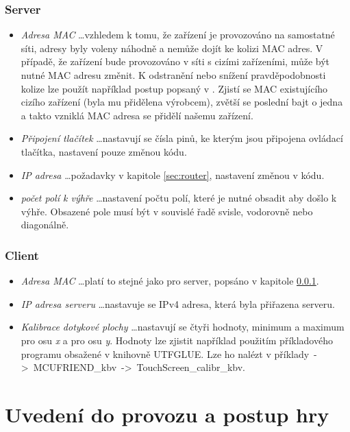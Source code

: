 \documentclass[a4paper,12pt, twoside]{article} %
\begin{document}
\subsubsection{Server}
\label{sec:nastaveni_server}
\begin{itemize}
\item \textit{Adresa MAC} \ldots vzhledem k tomu, že zařízení je provozováno na samostatné síti, adresy byly voleny náhodně a nemůže dojít ke kolizi MAC adres. V případě, že zařízení bude provozováno v síti s cizími zařízeními,  může být nutné MAC adresu změnit. K odstranění nebo snížení pravděpodobnosti kolize lze použít například postup popsaný v \cite{nastaveni_mac}. Zjistí se MAC existujícího cizího zařízení (byla mu přidělena výrobcem), zvětší se poslední bajt o jedna a takto vzniklá MAC adresa se přidělí našemu zařízení.
\item \textit{Připojení tlačítek} \ldots nastavují se čísla pinů, ke kterým jsou připojena ovládací tlačítka, nastavení pouze změnou kódu.
\item \textit{IP adresa} \ldots požadavky v kapitole \ref{sec:router}, nastavení změnou v kódu.
\item \textit{počet polí k výhře} \ldots nastavení počtu polí, které je nutné obsadit aby došlo k výhře. Obsazené pole musí být v souvislé řadě svisle, vodorovně nebo diagonálně. 
\end{itemize}
\subsubsection{Client}
\label{sec:nastaveni_client}
\begin{itemize}
\item \textit{Adresa MAC} \ldots platí to stejné jako pro server, popsáno v kapitole \ref{sec:nastaveni_server}.
\item \textit{IP adresa serveru} \ldots nastavuje se IPv4 adresa, která byla přiřazena serveru.
\item \textit{Kalibrace dotykové plochy} \ldots nastavují se čtyři hodnoty, minimum a maximum pro osu \textit{x} a pro osu \textit{y}. Hodnoty lze zjistit například použitím příkladového programu obsažené v knihovně UTFGLUE. Lze ho nalézt v příklady~->~MCUFRIEND\_kbv~->~TouchScreen\_calibr\_kbv.
\end{itemize}
\clearpage
\section{Uvedení do provozu a postup hry}
\end{document}
